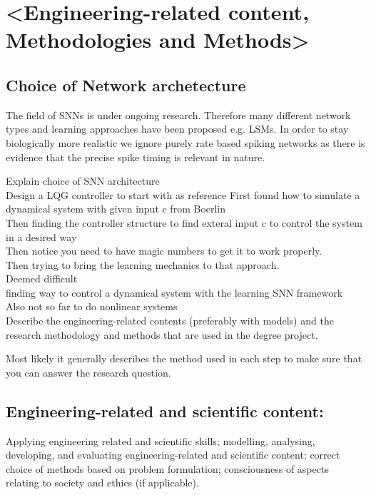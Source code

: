 \chapter{<Engineering-related content, Methodologies and Methods>}



\section{Choice of Network archetecture}
The field of \acp{SNN} is under ongoing research. Therefore many different network types and learning approaches have been proposed e.g. \acp{LSM}. In order to stay biologically more realistic we ignore purely rate based spiking networks as there is evidence that the precise spike timing is relevant in nature\cite{brette_philosophy_2015}\cite{putney_precise_2019}.


Explain choice of SNN architecture\\

Design a LQG controller to start with as reference
First found how to simulate a dynamical system with given input c from Boerlin\\
Then finding the controller structure to find exteral input c to control the system in a desired way\\
Then notice you need to have magic numbers to get it to work properly.\\
Then trying to bring the learning mechanics to that approach.\\
Deemed difficult\\
finding way to control a dynamical system with the learning SNN framework\\
Also not so far to do nonlinear systems\\


Describe the engineering-related contents (preferably with models) and the research methodology and methods that are used in the degree project.

Most likely it generally describes the method used in each step to make sure that you can answer the research question.

\section{Engineering-related and scientific content:}
Applying engineering related and scientific skills; modelling, analysing, developing, and evaluating engineering-related and scientific content; correct choice of methods based on problem formulation; consciousness of aspects relating to society and ethics (if applicable).

